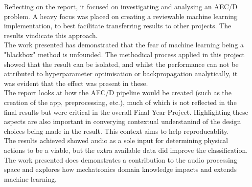 \documentclass{UoNMCHA}
\numberwithin{equation}{section}
\begin{document}
Reflecting on the report, it focused on investigating and analysing an AEC/D problem. A heavy focus was placed on creating a reviewable machine learning implementation, to best facilitate transferring results to other projects. The results vindicate this approach.
\\
The work presented has demonstrated that the fear of machine learning being a "blackbox" method is unfounded. The methodical process applied in this project showed that the result can be isolated, and whilst the performance can not be attributed to hyperparameter optimisation or backpropagation analytically, it was evident that the effect was present in these. 
\\
The report looks at how the AEC/D pipeline would be created (such as the creation of the app, preprocessing, etc.), much of which is not reflected in the final results but were critical in the overall Final Year Project. Highlighting these aspects are also important in converying contextual understanind of the design choices being made in the result. This context aims to help reproducablity. 
\\
The results achieved showed audio as a sole input for determining physical actions to be a viable, but the extra available data did improve the classification. The work presented does demonstrates a contribution to the audio processing space and explores how mechatronics domain knowledge impacts and extends machine learning.


\end{document}
